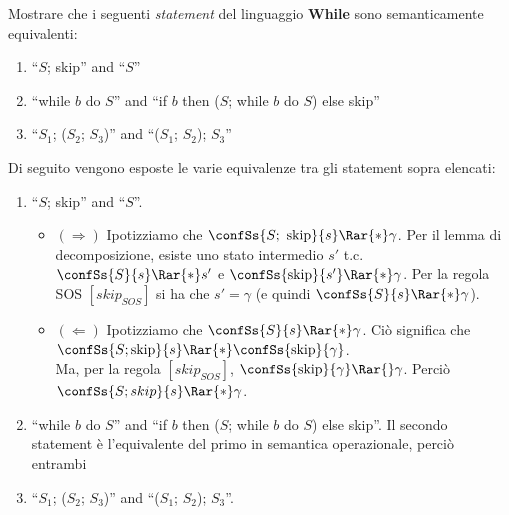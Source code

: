 {
  Mostrare che i seguenti \textit{statement} del linguaggio \textbf{While} sono
  semanticamente equivalenti:
  \begin{enumerate}
    \item ``$S$; skip'' and ``$S$''
    \item ``while $b$ do $S$'' and
      ``if $b$ then ($S$; while $b$ do $S$) else skip''
    \item ``$S_1$; ($S_2$; $S_3$)'' and ``($S_1$; $S_2$); $S_3$''
  \end{enumerate}
}
{
  Di seguito vengono esposte le varie equivalenze tra gli statement sopra
  elencati:

  \begin{enumerate}
    \item ``$S$; skip'' and ``$S$''.

    \begin{itemize}
      \item $(\Rightarrow)$ Ipotizziamo che
      $\confSs{S;\mbox{ skip}}{s} \Rar{*} \gamma$. Per il lemma di
      decomposizione, esiste uno stato intermedio $s'$ t.c.
      $\confSs{S}{s} \Rar{*} s'$ e $\confSs{\mbox{skip}}{s'} \Rar{*} \gamma$.
      Per la regola SOS $[skip_{SOS}]$ si ha che $s' = \gamma$ (e quindi
      $\confSs{S}{s} \Rar{*} \gamma$).

      \item $(\Leftarrow)$ Ipotizziamo che $\confSs{S}{s} \Rar{*} \gamma$. Ciò
      significa che
      $\confSs{S; \mbox{skip}}{s} \Rar{*} \confSs{\mbox{skip}}{\gamma}$. \\
      Ma, per la regola $[skip_{SOS}]$,
      $\confSs{\mbox{skip}}{\gamma} \Rar{} \gamma$. Perciò
      $\confSs{S; skip}{s} \Rar{*} \gamma$.
    \end{itemize}


    \item ``while $b$ do $S$'' and
      ``if $b$ then ($S$; while $b$ do $S$) else skip''. Il secondo statement è
      l'equivalente del primo in semantica operazionale, perciò entrambi

    \item ``$S_1$; ($S_2$; $S_3$)'' and ``($S_1$; $S_2$); $S_3$''.
  \end{enumerate}
}
